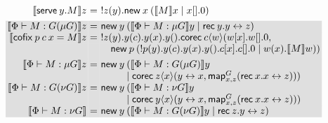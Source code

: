 \documentclass[orivec,envcountsame]{llncs}
\makeatletter
\newcommand{\gvtyp}[3]{#1 \vdash #2 : #3}
\newcommand{\mapname}{\mathsf{map}}
\newcommand{\map}[3]{\mapname^{#1}_{#2}(#3)}
\newcommand{\mkwd}[1]{\mathsf{#1}}
\newcommand{\link}[2]{#1 \leftrightarrow #2}
\newcommand{\cut}[4]{\mkwd{new}\:#1 \: (#3 \mid #4)}
\newcommand{\replicate}[2]{{!#1(#2)}}
\newcommand{\rec}[1]{\mkwd{rec}\:#1}
\newcommand{\corec}[4]{\mkwd{corec}\:{#1} \langle #2 \rangle (#3,#4)}
\newcommand{\lrkwd}{\mkwd{cofix}}
\newcommand{\gvfix}[3]{\lrkwd\:#1\:#2 = #3}
\newcommand{\gvserve}[2]{\mkwd{serve}\:#1.#2}
\newcommand{\key}{\mkwd}
\newcommand{\tocpbig}[1]{\left\llbracket #1 \right\rrbracket}
\newcommand{\tocp}[1]{\llbracket #1 \rrbracket}
\newcommand{\ba}{\begin{array}}
\newcommand{\ea}{\end{array}}
\newcommand{\bl}{\ba[t]{@{}l@{}}}
\newcommand{\el}{\ea}
\newenvironment{equations}{\[\ba{@{}r@{~}c@{~}l@{}}}{\ea\]}
\newcommand\shade[1]{\setlength{\fboxsep}{0pt}\colorbox{shade}{\ensuremath{#1}}}
\newcommand\shaderow{\noalign{\vskip-0.4pt}\rowcolor{shade}[0.6mm]}
\makeatother
\begin{document}
\begin{figure}[float]
\begin{equations}
\tocp{\gvserve{y}{M}}z &=& \replicate{z}{y}.\cut{x}{}{\tocp{M}x}{x[].0} \\[1ex] \shaderow
\tocp{\gvtyp{\Phi}{M}{G(\mu G)}}z &=&
  \cut{y}{\nu \tocp{G}}{\tocp{\gvtyp{\Phi}{M}{\mu G}}y}{\rec{y}.\link{y}{z}} \\ \shaderow
\tocp{\gvfix{p}{c\:x}{M}}z &=&
\replicate{z}{y}.y(c).y(x).y().
 \corec{c}{w}{w[x].w[].0}{\\ \shaderow
&& \quad \cut{p}{}{\replicate{p}{y}.y(c).y(x).y().c[x].c[].0}{w(x).\tocp{M}w}} \\[1ex]
\shaderow
\tocp{\gvtyp{\Phi}{M}{\mu G}}z &=&
\key{new}\:y\:
  \bl
  (
       \tocp{\gvtyp{\Phi}{M}{G(\mu G)}}y \\
  \mid \corec{z}{x}
             {\link{y}{x}}
             {\map{G}{x,z}{\rec{x}.\link{x}{z}}}) \\
  \el \\ \shaderow
\tocp{\gvtyp{\Phi}{M}{G(\nu G)}}z &=&
\key{new}\:y\:
  \bl
  (
       \tocp{\gvtyp{\Phi}{M}{\nu G}}y \\
  \mid \corec{y}{x}
             {\link{y}{x}}
             {\map{G}{x,z}{\rec{x}.\link{x}{z}}}) \\
  \el \\ \shaderow
\tocp{\gvtyp{\Phi}{M}{\nu G}} &=&
  \cut{y}{\nu \tocp{G}}{\tocp{\gvtyp{\Phi}{M}{G(\nu G)}}y}{\rec{z}.\link{y}{z}} \\
\end{equations}%

\end{figure}
\end{document}
